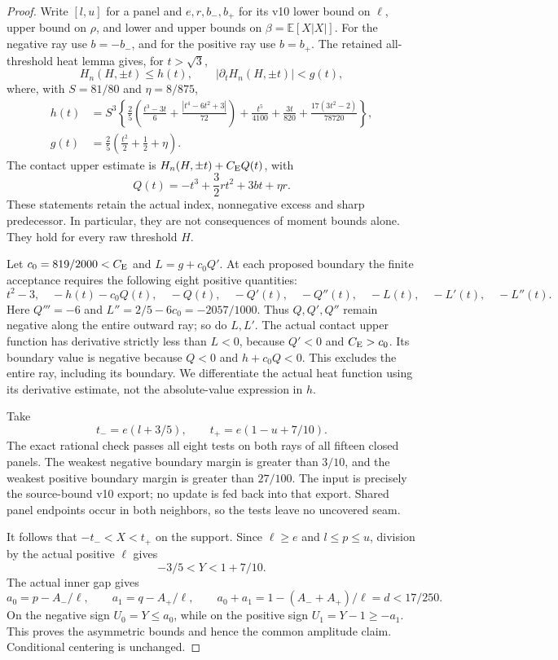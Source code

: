 \begin{proof}
Write $[l,u]$ for a panel and $e,r,b_-,b_+$ for its v10 lower bound on
$\ell$, upper bound on $\rho$, and lower and upper bounds on
$\beta=\mathbb E[X|X|]$. For the negative ray use $b=-b_-$, and for
the positive ray use $b=b_+$. The retained all-threshold heat lemma gives,
for $t>\sqrt3$,
\[
 H_n(H,\pm t)\le h(t),\qquad
 |\partial_t H_n(H,\pm t)|<g(t),
\]
where, with $S=81/80$ and $\eta=8/875$,
\[
 \begin{aligned}
 h(t)&=S^3\left\{\frac25\left(\frac{t^3-3t}{6}
       +\frac{|t^4-6t^2+3|}{72}\right)
       +\frac{t^5}{4100}+\frac{3t}{820}
       +\frac{17(3t^2-2)}{78720}\right\},\\
 g(t)&=\frac25\left(\frac{t^2}{2}+\frac12+\eta\right).
 \end{aligned}
\]
The contact upper estimate is $H_n(H,\pm t)+C_{\rm E}Q(t)$, with
\[
 Q(t)=-t^3+\frac32rt^2+3bt+\eta r.
\]
These statements retain the actual index, nonnegative excess and sharp
predecessor. In particular, they are not consequences of moment bounds
alone. They hold for every raw threshold $H$.

Let $c_0=819/2000<C_{\rm E}$ and $L=g+c_0Q'$. At each proposed
boundary the finite acceptance requires the following eight positive
quantities:
\[
 t^2-3,\quad -h(t)-c_0Q(t),\quad -Q(t),\quad -Q'(t),
 \quad -Q''(t),\quad -L(t),\quad -L'(t),\quad -L''(t).
\]
Here $Q'''=-6$ and $L''=2/5-6c_0=-2057/1000$.
Thus $Q,Q',Q''$ remain negative along the entire outward ray; so do
$L,L'$. The actual contact upper function has derivative strictly less
than $L<0$, because $Q'<0$ and $C_{\rm E}>c_0$. Its boundary value is
negative because $Q<0$ and $h+c_0Q<0$. This excludes the entire ray,
including its boundary. We differentiate the actual heat function using
its derivative estimate, not the absolute-value expression in $h$.

Take
\[
 t_-=e(l+3/5),\qquad t_+=e(1-u+7/10).
\]
The exact rational check passes all eight tests on both rays of all
fifteen closed panels. The weakest negative boundary margin is greater
than $3/10$, and the weakest positive boundary margin is greater than
$27/100$. The input is precisely the source-bound v10 export; no update
is fed back into that export. Shared panel endpoints occur in both
neighbors, so the tests leave no uncovered seam.

It follows that $-t_-<X<t_+$ on the support. Since $\ell\ge e$ and
$l\le p\le u$, division by the actual positive $\ell$ gives
\[
 -3/5<Y<1+7/10.
\]
The actual inner gap gives
\[
 a_0=p-A_-/\ell,\qquad a_1=q-A_+/\ell,\qquad
 a_0+a_1=1-(A_-+A_+)/\ell=d<17/250.
\]
On the negative sign $U_0=Y\le a_0$, while on the positive sign
$U_1=Y-1\ge-a_1$. This proves the asymmetric bounds and hence the
common amplitude claim. Conditional centering is unchanged.
\end{proof}


